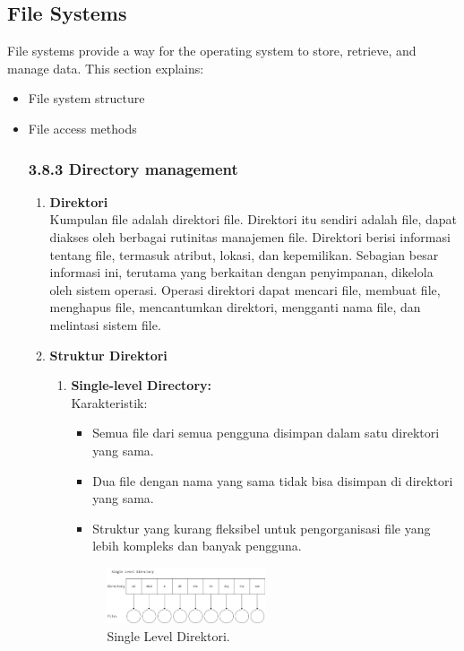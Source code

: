 \documentclass[12pt]{article}
\begin{document}
\subsection{File Systems}
File systems provide a way for the operating system to store, retrieve, and manage data. This section explains:
\begin{itemize}
    \item File system structure
    \item File access methods
    \subsubsection*{3.8.3 Directory management}
    
    \begin{enumerate}
    \item \textbf{Direktori} \\
    Kumpulan file adalah direktori file. Direktori itu sendiri adalah file, dapat diakses oleh berbagai rutinitas manajemen file. Direktori berisi informasi tentang file, termasuk atribut, lokasi, dan kepemilikan. Sebagian besar informasi ini, terutama yang berkaitan dengan penyimpanan, dikelola oleh sistem operasi. Operasi direktori dapat mencari file, membuat file, menghapus file, mencantumkan direktori, mengganti nama file, dan melintasi sistem file.

    \item \textbf{Struktur Direktori}
    \begin{enumerate}[label=\alph*.]
        \item \textbf{Single-level Directory:} \\
        Karakteristik:
        \begin{itemize}
            \item Semua file dari semua pengguna disimpan dalam satu direktori yang sama.
            \item Dua file dengan nama yang sama tidak bisa disimpan di direktori yang sama.
            \item Struktur yang kurang fleksibel untuk pengorganisasi file yang lebih kompleks dan banyak pengguna.
        \end{itemize}

        \begin{figure}[h]
        \centering
        \includegraphics[width=0.5\textwidth]{assets/gambar1.jpg}
        \caption{Single Level Direktori.}
        \label{fig:single-level-direktori}
        \end{figure}


\end{enumerate}
\end{enumerate}
\end{itemize}
\end{document}
